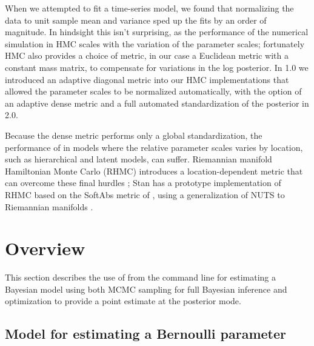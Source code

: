 \documentclass[article]{jss}
\begin{document}
When we attempted to fit a time-series model, we found that
normalizing the data to unit sample mean and variance sped up the fits
by an order of magnitude.  In hindsight this isn't surprising, as the
performance of the numerical simulation in HMC scales with the
variation of the parameter scales; fortunately HMC also provides a
choice of metric, in our case a Euclidean metric with a constant mass
matrix, to compensate for variations in the log posterior.  In
 1.0 we introduced an adaptive diagonal metric into our
HMC implementations that allowed the parameter scales to be normalized
automatically, with the option of an adaptive dense metric and a full
automated standardization of the posterior in  2.0.

Because the dense metric performs only a global standardization, the
performance of  in models where the relative parameter
scales varies by location, such as hierarchical and latent models, can
suffer.  Riemannian manifold Hamiltonian Monte Carlo (RHMC) introduces
a location-dependent metric that can overcome these final hurdles
\citep{GirolamiCalderhead:2011}; Stan has a prototype implementation
of RHMC based on the SoftAbs metric of \citep{Betancourt:2012}, using
a generalization of NUTS to Riemannian manifolds \citep{Betancourt:2013}.

\section{Overview}

This section describes the use of  from the command
line for estimating a Bayesian model using both MCMC sampling for full
Bayesian inference and optimization to provide a point estimate at the
posterior mode.

\subsection{Model for estimating a Bernoulli parameter}
\end{document}
